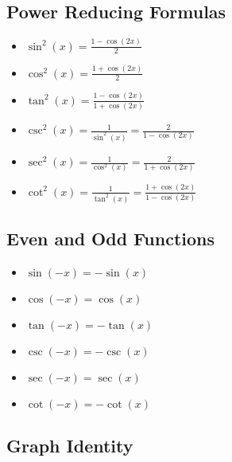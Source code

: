 \subsection{Power Reducing Formulas}

\begin{itemize}

    \item \( \sin^2(x) = \frac{1 - \cos(2x)}{2} \)

    \item \( \cos^2(x) = \frac{1 + \cos(2x)}{2} \)

    \item \( \tan^2(x) = \frac{1 - \cos(2x)}{1 + \cos(2x)}\)

    \item \( \csc^2(x) = \frac{1}{\sin^2(x)} = \frac{2}{1 - \cos(2x)} \)

    \item \( \sec^2(x) = \frac{1}{\cos^2(x)} = \frac{2}{1 + \cos(2x)} \)

    \item \( \cot^2(x) = \frac{1}{\tan^2(x)} = \frac{1 + \cos(2x)}{1 - \cos(2x)}\)

\end{itemize}

\subsection{Even and Odd Functions}

\begin{itemize}

    \item \( \sin(-x) = -\sin(x) \)

    \item \( \cos(-x) = \cos(x) \)

    \item \( \tan(-x) = -\tan(x) \)

    \item \( \csc(-x) = -\csc(x) \)

    \item \( \sec(-x) = \sec(x) \)

    \item \( \cot(-x) = -\cot(x) \)

\end{itemize}

\subsection{Graph Identity}

